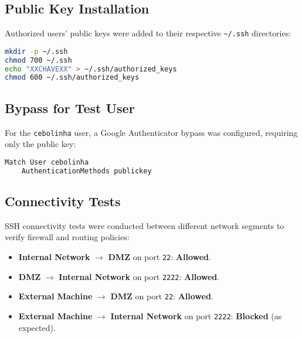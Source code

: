 \documentclass[12pt]{report}
\begin{document}
\subsection*{Public Key Installation}

Authorized users' public keys were added to their respective \texttt{\textasciitilde/.ssh} directories:

\begin{lstlisting}[language=bash, caption={Directory Creation and Key Installation}]
mkdir -p ~/.ssh
chmod 700 ~/.ssh
echo "XXCHAVEXX" > ~/.ssh/authorized_keys
chmod 600 ~/.ssh/authorized_keys
\end{lstlisting}

\subsection*{Bypass for Test User}

For the \texttt{cebolinha} user, a Google Authenticator bypass was configured, requiring only the public key:

\begin{lstlisting}[language=bash, caption={Match rule for test user}]
Match User cebolinha
    AuthenticationMethods publickey
\end{lstlisting}

\subsection*{Connectivity Tests}

SSH connectivity tests were conducted between different network segments to verify firewall and routing policies:

\begin{itemize}
    \item \textbf{Internal Network} $\rightarrow$ \textbf{DMZ} on port \texttt{22}: \textbf{Allowed}.
    \item \textbf{DMZ} $\rightarrow$ \textbf{Internal Network} on port \texttt{2222}: \textbf{Allowed}.
    \item \textbf{External Machine} $\rightarrow$ \textbf{DMZ} on port \texttt{22}: \textbf{Allowed}.
    \item \textbf{External Machine} $\rightarrow$ \textbf{Internal Network} on port \texttt{2222}: \textbf{Blocked} (as expected).
\end{itemize}
\end{document}
